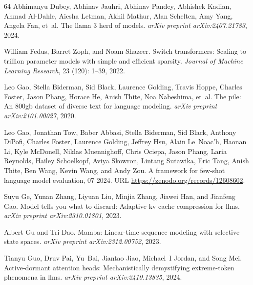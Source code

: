 \documentclass{article} \usepackage{iclr2025_conference,times}
\begin{document}
\begin{thebibliography}{64}
Abhimanyu Dubey, Abhinav Jauhri, Abhinav Pandey, Abhishek Kadian, Ahmad Al-Dahle, Aiesha Letman, Akhil Mathur, Alan Schelten, Amy Yang, Angela Fan, et~al.
\newblock The llama 3 herd of models.
\newblock \emph{arXiv preprint arXiv:2407.21783}, 2024.

William Fedus, Barret Zoph, and Noam Shazeer.
\newblock Switch transformers: Scaling to trillion parameter models with simple and efficient sparsity.
\newblock \emph{Journal of Machine Learning Research}, 23 (120): 1--39, 2022.

Leo Gao, Stella Biderman, Sid Black, Laurence Golding, Travis Hoppe, Charles Foster, Jason Phang, Horace He, Anish Thite, Noa Nabeshima, et~al.
\newblock The pile: An 800gb dataset of diverse text for language modeling.
\newblock \emph{arXiv preprint arXiv:2101.00027}, 2020.

Leo Gao, Jonathan Tow, Baber Abbasi, Stella Biderman, Sid Black, Anthony DiPofi, Charles Foster, Laurence Golding, Jeffrey Hsu, Alain Le~Noac'h, Haonan Li, Kyle McDonell, Niklas Muennighoff, Chris Ociepa, Jason Phang, Laria Reynolds, Hailey Schoelkopf, Aviya Skowron, Lintang Sutawika, Eric Tang, Anish Thite, Ben Wang, Kevin Wang, and Andy Zou.
\newblock A framework for few-shot language model evaluation, 07 2024.
\newblock URL \url{https://zenodo.org/records/12608602}.

Suyu Ge, Yunan Zhang, Liyuan Liu, Minjia Zhang, Jiawei Han, and Jianfeng Gao.
\newblock Model tells you what to discard: Adaptive kv cache compression for llms.
\newblock \emph{arXiv preprint arXiv:2310.01801}, 2023.

Albert Gu and Tri Dao.
\newblock Mamba: Linear-time sequence modeling with selective state spaces.
\newblock \emph{arXiv preprint arXiv:2312.00752}, 2023.

Tianyu Guo, Druv Pai, Yu~Bai, Jiantao Jiao, Michael~I Jordan, and Song Mei.
\newblock Active-dormant attention heads: Mechanistically demystifying extreme-token phenomena in llms.
\newblock \emph{arXiv preprint arXiv:2410.13835}, 2024{}.


\end{thebibliography}
\end{document}
